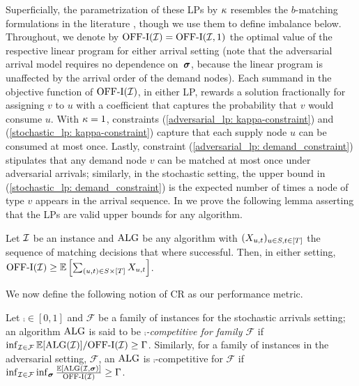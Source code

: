 Superficially, the parametrization of these LPs by $\kappa$ resembles the $b$-matching formulations in the literature \citep{kalyanasundaram2000optimal}, though we use them to define imbalance below. Throughout, we denote by $\mathrm{\mathrm{OFF}}\textrm{-}\mathrm{I}(\mathcal I) = \mathrm{\mathrm{OFF}}\textrm{-}\mathrm{I}(\mathcal I, 1)$ the optimal value of the respective linear program for either arrival setting (note that the adversarial arrival model requires no dependence on~$\bm{\sigma}$, because the linear program is unaffected by the arrival order of the demand nodes). Each summand in the objective function of $\mathrm{\mathrm{OFF}}\textrm{-}\mathrm{I}(\mathcal I)$, in either LP, rewards a solution fractionally for assigning $v$ to $u$ with a coefficient that captures the probability that $v$ would consume $u$. With $\kappa=1$, constraints (\ref{adversarial_lp: kappa-constraint}) and (\ref{stochastic_lp: kappa-constraint}) capture that each supply node $u$ can be consumed at most once. Lastly, constraint (\ref{adversarial_lp: demand_constraint}) stipulates that any demand node $v$ can be matched at most once under adversarial arrivals; similarly, in the stochastic setting, the upper bound in (\ref{stochastic_lp: demand_constraint})  is the expected number of times a node of type $v$ appears in the arrival sequence. In  we prove the following lemma asserting that the LPs are valid upper bounds for any algorithm. 

\begin{lemma}
    \label{lemma: offline is upper bound}
    Let $\mathcal I$ be an instance and $\mathrm{ALG}$ be any algorithm with $(X_{u,t})_{u \in S, t \in [T]}$ the sequence of matching decisions that where successful. Then, in either setting,
    $\mathrm{\mathrm{OFF}}\textrm{-}\mathrm{I}(\mathcal I) \geq  \mathbb E\left[\sum_{ (u,t) \in S \times [T]} X_{u,t} \right]$.
\end{lemma}



We now define the following notion of CR as our performance metric.


\begin{definition}%
Let $\comp \in [0,1]$ and $\mathcal{F}$ be a family of instances for the stochastic arrivals setting; an algorithm $\mathrm{ALG}$ is said to be \textit{$\comp$-competitive for family $\mathcal{F}$} if
$        \inf_{\mathcal I \in \mathcal{F}}{\mathbb E[\mathrm{ALG}(\mathcal I)] }/{\mathrm{\mathrm{OFF}}\textrm{-}\mathrm{I}(\mathcal I)} \geq \Gamma$.
    Similarly, for a family of instances in the adversarial setting, $\mathcal{F}$,  an $\mathrm{ALG}$ is $\comp$-competitive for $\mathcal{F}$ if
        $\inf_{\mathcal I \in \mathcal{F}} \inf_{\bm{\sigma}} \frac{\mathbb E[\mathrm{ALG}(\mathcal I, \bm{\sigma})] }{\mathrm{\mathrm{OFF}}\textrm{-}\mathrm{I}(\mathcal I)} \geq \Gamma$.
\end{definition}

